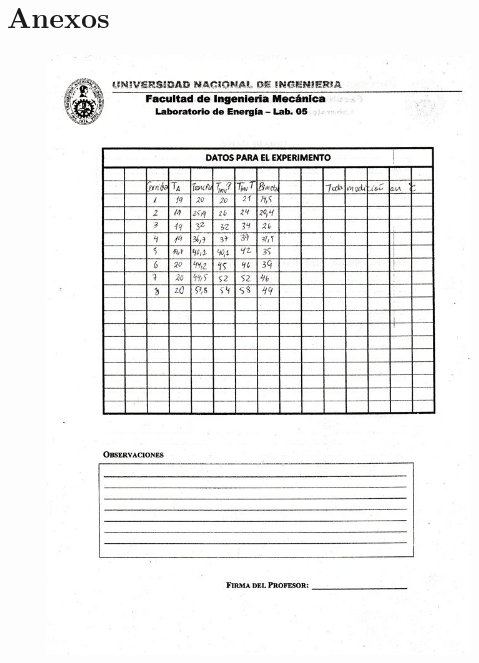 \documentclass[a4paper,11pt]{report}
\begin{document}
\chapter*{Anexos}
\begin{figure}[H]
\includegraphics[scale=0.55]{datos.jpg}
\end{figure}
\end{document}
